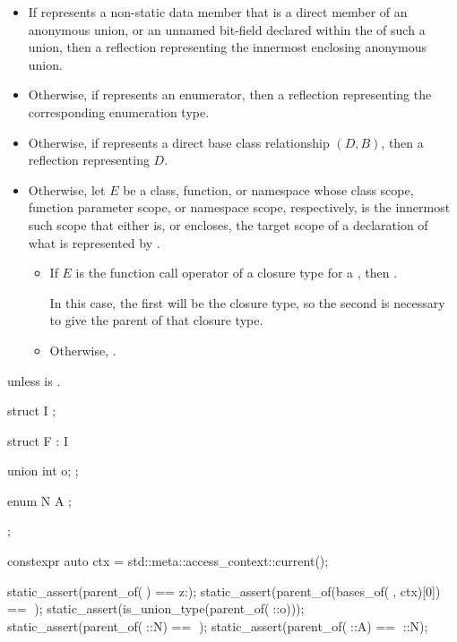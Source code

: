 \begin{itemdescr}
\pnum
\returns
\begin{itemize}
\item
  If  represents a non-static data member
  that is a direct member of an anonymous union,
  or an unnamed bit-field declared
  within the  of such a union,
  then a reflection representing the innermost enclosing anonymous union.
\item
  Otherwise, if  represents an enumerator,
  then a reflection representing the corresponding enumeration type.
\item
  Otherwise, if  represents a direct base class relationship $(D, B)$,
  then a reflection representing $D$.
\item
  Otherwise, let $E$ be a class, function, or namespace
  whose class scope, function parameter scope, or namespace scope, respectively,
  is the innermost such scope that either is, or encloses,
  the target scope of a declaration of what is represented by .
  \begin{itemize}
  \item
    If $E$ is the function call operator of a closure type
    for a ,
    then .
    \begin{note}
    In this case,
    the first  will be the closure type,
    so the second  is necessary
    to give the parent of that closure type.
    \end{note}
  \item
    Otherwise, .
  \end{itemize}
\end{itemize}

\pnum
\throws
{} unless
 is .

\pnum
\begin{example}
\begin{codeblock}
struct I { };

struct F : I {
  union {
    int o;
  };

  enum N {
    A
  };
};

constexpr auto ctx = std::meta::access_context::current();

static_assert(parent_of(^^F) == ^^::);
static_assert(parent_of(bases_of(^^F, ctx)[0]) == ^^F);
static_assert(is_union_type(parent_of(^^F::o)));
static_assert(parent_of(^^F::N) == ^^F);
static_assert(parent_of(^^F::A) == ^^F::N);
\end{codeblock}
\end{example}
\end{itemdescr}


